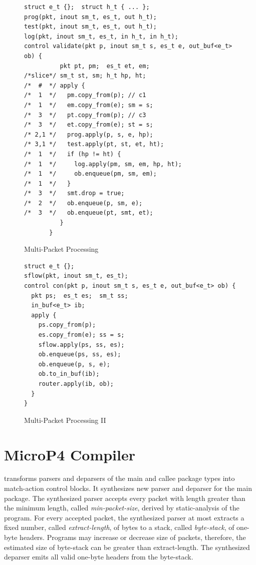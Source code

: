 \documentclass[letterpaper,twocolumn,10pt]{article}
\begin{document}
\begin{figure}[!h]
 \begin{lstlisting}[frame=none]
struct e_t {};  struct h_t { ... };
prog(pkt, inout sm_t, es_t, out h_t);
test(pkt, inout sm_t, es_t, out h_t);
log(pkt, inout sm_t, es_t, in h_t, in h_t);
control validate(pkt p, inout sm_t s, es_t e, out_buf<e_t> ob) {
          pkt pt, pm;  es_t et, em;  
/*slice*/ sm_t st, sm; h_t hp, ht;
/*  #  */ apply {
/*  1  */   pm.copy_from(p); // c1
/*  1  */   em.copy_from(e); sm = s;
/*  3  */   pt.copy_from(p); // c3 
/*  3  */   et.copy_from(e); st = s;
/* 2,1 */   prog.apply(p, s, e, hp); 
/* 3,1 */   test.apply(pt, st, et, ht); 
/*  1  */   if (hp != ht) {
/*  1  */     log.apply(pm, sm, em, hp, ht);
/*  1  */     ob.enqueue(pm, sm, em);
/*  1  */   }
/*  3  */   smt.drop = true;
/*  2  */   ob.enqueue(p, sm, e);
/*  3  */   ob.enqueue(pt, smt, et);
          }
       }
\end{lstlisting}
\caption{Multi-Packet Processing}
\label{fig:multi-packet-processing}

\begin{lstlisting}[frame=none]
struct e_t {};
sflow(pkt, inout sm_t, es_t);
control con(pkt p, inout sm_t s, es_t e, out_buf<e_t> ob) {
  pkt ps;  es_t es;  sm_t ss;
  in_buf<e_t> ib;
  apply {
    ps.copy_from(p);
    es.copy_from(e); ss = s;
    sflow.apply(ps, ss, es); 
    ob.enqueue(ps, ss, es);
    ob.enqueue(p, s, e);
    ob.to_in_buf(ib);
    router.apply(ib, ob);
  }
}
\end{lstlisting}
\caption{Multi-Packet Processing II}
\label{fig:multi-packet-processing-II}
\end{figure}








\section{MicroP4 Compiler}
\label{sec:compiler}
\ucomp transforms parsers and deparsers of the main and callee package types into match-action control blocks.
It synthesizes new parser and deparser for the main package.
The synthesized parser accepts every packet with length greater than the minimum length, called \emph{min-packet-size}, derived by static-analysis of the program.
For every accepted packet, the synthesized parser at most extracts a fixed number, called \emph{extract-length}, of bytes to a stack, called \emph{byte-stack}, of one-byte headers.
Programs may increase or decrease size of packets, therefore, the estimated size of byte-stack can be greater than extract-length.
The synthesized deparser emits all valid one-byte headers from the byte-stack.
\end{document}
